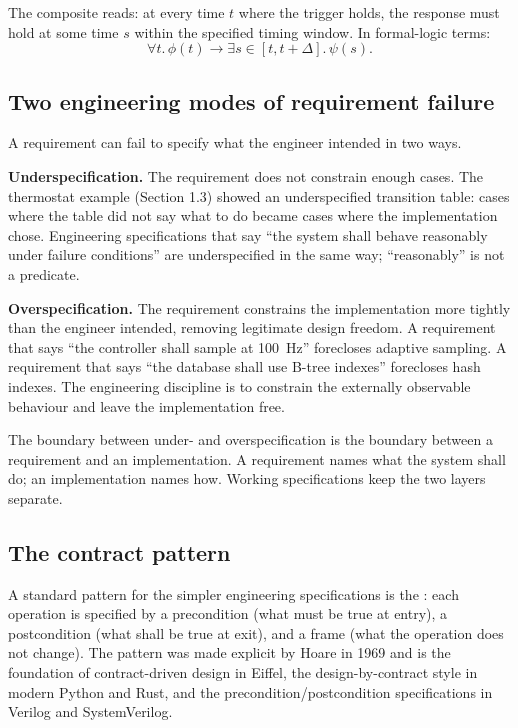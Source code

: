 The composite reads: at every time $t$ where the trigger holds, the response must hold at some time $s$ within the specified timing window. In formal-logic terms:
\[
\forall t.\, \phi(t) \to \exists s \in [t, t + \Delta].\, \psi(s).
\]

\subsection{Two engineering modes of requirement failure}

A requirement can fail to specify what the engineer intended in two ways.

\textbf{Underspecification.} The requirement does not constrain enough cases. The thermostat example (Section 1.3) showed an underspecified transition table: cases where the table did not say what to do became cases where the implementation chose. Engineering specifications that say ``the system shall behave reasonably under failure conditions'' are underspecified in the same way; ``reasonably'' is not a predicate.

\textbf{Overspecification.} The requirement constrains the implementation more tightly than the engineer intended, removing legitimate design freedom. A requirement that says ``the controller shall sample at \SI{100}{\hertz}'' forecloses adaptive sampling. A requirement that says ``the database shall use B-tree indexes'' forecloses hash indexes. The engineering discipline is to constrain the externally observable behaviour and leave the implementation free.

The boundary between under- and overspecification is the boundary between a requirement and an implementation. A requirement names what the system shall do; an implementation names how. Working specifications keep the two layers separate.

\subsection{The contract pattern}

A standard pattern for the simpler engineering specifications is the : each operation is specified by a precondition (what must be true at entry), a postcondition (what shall be true at exit), and a frame (what the operation does not change). The pattern was made explicit by Hoare in 1969 and is the foundation of contract-driven design in Eiffel, the design-by-contract style in modern Python and Rust, and the precondition/postcondition specifications in Verilog and SystemVerilog.

